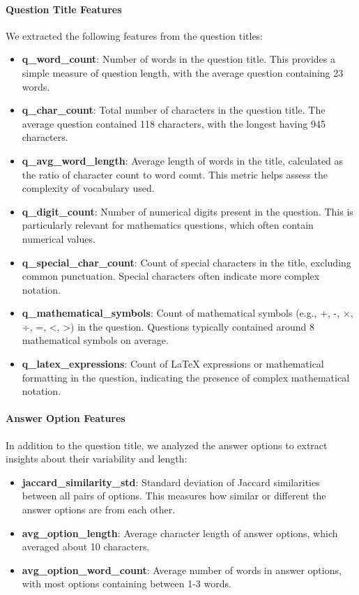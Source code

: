\documentclass[
    a4paper, %
    10pt, %
    twoside, %
]{LTJournalArticle}
\begin{document}
\paragraph{Question Title Features}
We extracted the following features from the question titles:
\begin{itemize}
    \item \textbf{q\_word\_count}: Number of words in the question title. This provides a simple measure of question length, with the average question containing 23 words.
    \item \textbf{q\_char\_count}: Total number of characters in the question title. The average question contained 118 characters, with the longest having 945 characters.
    \item \textbf{q\_avg\_word\_length}: Average length of words in the title, calculated as the ratio of character count to word count. This metric helps assess the complexity of vocabulary used.
    \item \textbf{q\_digit\_count}: Number of numerical digits present in the question. This is particularly relevant for mathematics questions, which often contain numerical values.
    \item \textbf{q\_special\_char\_count}: Count of special characters in the title, excluding common punctuation. Special characters often indicate more complex notation.
    \item \textbf{q\_mathematical\_symbols}: Count of mathematical symbols (e.g., +, -, ×, ÷, =, \textless, \textgreater) in the question. Questions typically contained around 8 mathematical symbols on average.
    \item \textbf{q\_latex\_expressions}: Count of LaTeX expressions or mathematical formatting in the question, indicating the presence of complex mathematical notation.
\end{itemize}

\paragraph{Answer Option Features}
In addition to the question title, we analyzed the answer options to extract insights about their variability and length:
\begin{itemize}
    \item \textbf{jaccard\_similarity\_std}: Standard deviation of Jaccard similarities between all pairs of options. This measures how similar or different the answer options are from each other. 
    \item \textbf{avg\_option\_length}: Average character length of answer options, which averaged about 10 characters.
    \item \textbf{avg\_option\_word\_count}: Average number of words in answer options, with most options containing between 1-3 words.
\end{itemize}
\end{document}
